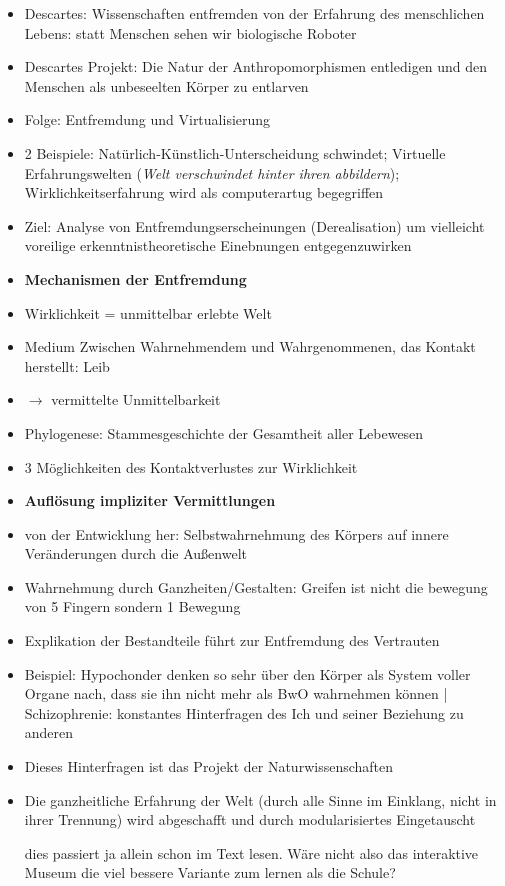 \documentclass[emulatestandardclasses]{scrartcl}
\begin{document}
\begin{itemize}
  \item Descartes: Wissenschaften entfremden von der Erfahrung des menschlichen Lebens: statt Menschen sehen wir biologische Roboter
  \item Descartes Projekt: Die Natur der Anthropomorphismen entledigen und den Menschen als unbeseelten Körper zu entlarven
  \item Folge: Entfremdung und Virtualisierung
  \item 2 Beispiele: Natürlich-Künstlich-Unterscheidung schwindet; Virtuelle Erfahrungswelten (\emph{Welt verschwindet hinter ihren abbildern}); Wirklichkeitserfahrung wird als computerartug begegriffen
  \item Ziel: Analyse von Entfremdungserscheinungen (Derealisation) um vielleicht voreilige erkenntnistheoretische Einebnungen entgegenzuwirken
  \item \textbf{Mechanismen der Entfremdung}
  \item Wirklichkeit = unmittelbar erlebte Welt
  \item Medium Zwischen Wahrnehmendem und Wahrgenommenen, das Kontakt herstellt: Leib
  \item $\rightarrow$ vermittelte Unmittelbarkeit
  \item Phylogenese: Stammesgeschichte der Gesamtheit aller Lebewesen
  \item 3 Möglichkeiten des Kontaktverlustes zur Wirklichkeit
  \item \textbf{Auflösung impliziter Vermittlungen}
  \item von der Entwicklung her: Selbstwahrnehmung des Körpers auf innere Veränderungen durch die Außenwelt
  \item Wahrnehmung durch Ganzheiten/Gestalten: Greifen ist nicht die bewegung von 5 Fingern sondern 1 Bewegung
  \item Explikation der Bestandteile führt zur Entfremdung des Vertrauten
  \item Beispiel: Hypochonder denken so sehr über den Körper als System voller Organe nach, dass sie ihn nicht mehr als BwO wahrnehmen können | Schizophrenie: konstantes Hinterfragen des Ich und seiner Beziehung zu anderen
  \item Dieses Hinterfragen ist das Projekt der Naturwissenschaften
  \item Die ganzheitliche Erfahrung der Welt (durch alle Sinne im Einklang, nicht in ihrer Trennung) wird abgeschafft und durch modularisiertes Eingetauscht
  \item [dies passiert ja allein schon im Text lesen. Wäre nicht also das interaktive Museum die viel bessere Variante zum lernen als die Schule?]

\end{itemize}
\end{document}
